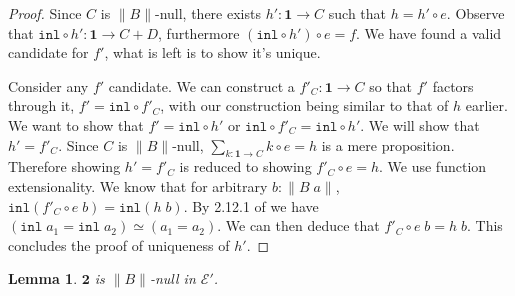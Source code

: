 \documentclass[12pt]{report}
\newtheorem{lem}[thm]{Lemma}
\theoremstyle{definition}
\begin{document}
\begin{proof}
Since $C$ is $\lVert B \rVert$-null, there exists $h' : \mathbf{1} \rightarrow C$ such that $h = h' \circ e$. 
Observe that $\mathtt{inl} \circ h' : \mathbf{1} \rightarrow C+D$, furthermore $(\mathtt{inl} \circ h') \circ e= f$. 
We have found a valid candidate for $f'$, what is left is to show it's unique. 

Consider any $f'$ candidate. 
We can construct a $f'_C : \mathbf{1} \rightarrow C$ so that $f'$ factors through it, $f' = \mathtt{inl} \circ f'_C$, with our construction being similar to that of $h$ earlier. 
We want to show that $f' = \mathtt{inl} \circ h'$ or $\mathtt{inl} \circ f'_C = \mathtt{inl} \circ h'$. 
We will show that $h' = f'_C$. 
Since $C$ is $\lVert B \rVert$-null, $\sum_{k : \mathbf{1} \rightarrow C} k \circ e = h$ is a mere proposition. 
Therefore showing $h' = f'_C$ is reduced to showing $f'_C \circ e = h$. 
We use function extensionality. 
We know that for arbitrary $b : \lVert B\; a \rVert$, $\mathtt{inl} (f'_C \circ e\; b ) = \mathtt{inl} (h\; b)$. 
By 2.12.1 of \cite{hottbook} we have $(\mathtt{inl}\; a_1 = \mathtt{inl}\; a_2) \simeq (a_1 = a_2)$. 
We can then deduce that $f'_C\circ e\; b = h\; b$. This concludes the proof of uniqueness of $h'$.

\end{proof}
\begin{lem}
$\mathbf{2}$ is $\lVert B \rVert$-null in $\mathcal{E}'$. 
\end{lem}
\end{document}
